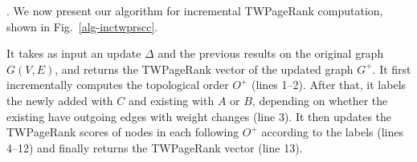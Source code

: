 
. We now present our algorithm for incremental TWPageRank  computation, shown in Fig.~\ref{alg-inctwprscc}.


It takes as input an update $\Delta$ and the previous results on the original graph $G(V, E)$, and returns the TWPageRank vector of the updated graph $G^+$. It first incrementally computes the topological order $O^+$
(lines 1--2). %
%
After that, it labels the newly added \sccs with $C$ and existing \sccs with $A$ or $B$, depending on whether the existing \sccs have outgoing edges with weight changes (line 3).
%
It then updates the TWPageRank scores of nodes in each \scc following $O^+$ according to the labels (lines 4--12) and finally returns the TWPageRank vector (line 13).
%
%


